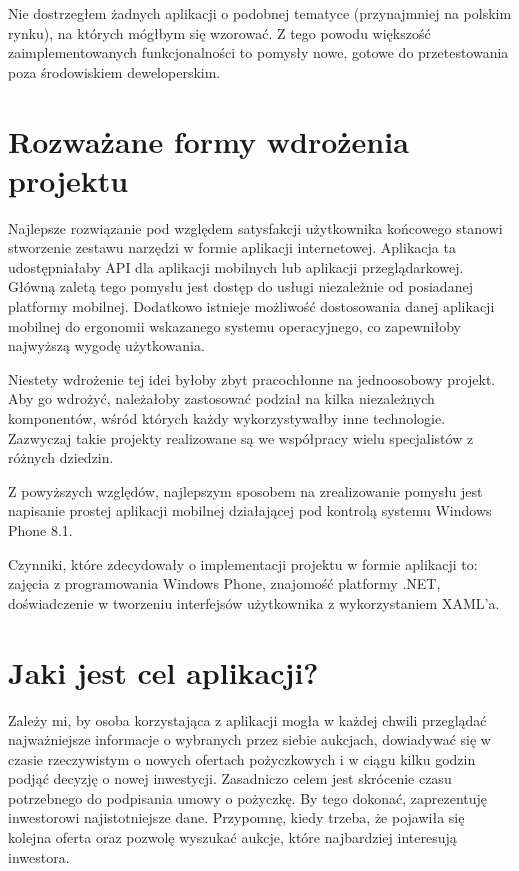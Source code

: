 \documentclass[a4paper,twoside,titlepage,openright]{book}
\begin{document}
Nie dostrzegłem żadnych aplikacji o podobnej tematyce (przynajmniej na polskim rynku), na których mógłbym się wzorować. Z tego powodu większość zaimplementowanych funkcjonalności to pomysły nowe, gotowe do przetestowania poza środowiskiem deweloperskim.

\section*{Rozważane formy wdrożenia projektu}

Najlepsze rozwiązanie pod względem satysfakcji użytkownika końcowego stanowi stworzenie zestawu narzędzi w formie aplikacji internetowej. Aplikacja ta udostępniałaby API dla aplikacji mobilnych lub aplikacji przeglądarkowej. Główną zaletą tego pomysłu jest dostęp do usługi niezależnie od posiadanej platformy mobilnej. Dodatkowo istnieje możliwość dostosowania danej aplikacji mobilnej do ergonomii wskazanego systemu operacyjnego, co zapewniłoby najwyższą wygodę użytkowania. 

Niestety wdrożenie tej idei byłoby zbyt pracochłonne na jednoosobowy projekt. Aby go wdrożyć, należałoby zastosować podział na kilka niezależnych komponentów, wśród których każdy wykorzystywałby inne technologie. Zazwyczaj takie projekty realizowane są we współpracy wielu specjalistów z różnych dziedzin.

Z powyższych względów, najlepszym sposobem na zrealizowanie pomysłu jest napisanie prostej aplikacji mobilnej działającej pod kontrolą systemu Windows Phone 8.1. 

Czynniki, które zdecydowały o implementacji projektu w formie aplikacji to: zajęcia z programowania Windows Phone, znajomość platformy .NET, doświadczenie w tworzeniu interfejsów użytkownika z wykorzystaniem XAML'a.

\section*{Jaki jest cel aplikacji?}

Zależy mi, by osoba korzystająca z aplikacji mogła w każdej chwili przeglądać najważniejsze informacje o wybranych przez siebie aukcjach, dowiadywać się w czasie rzeczywistym o nowych ofertach pożyczkowych i w ciągu kilku godzin podjąć decyzję o nowej inwestycji. Zasadniczo celem jest skrócenie czasu potrzebnego do podpisania umowy o pożyczkę. By tego dokonać, zaprezentuję inwestorowi najistotniejsze dane. Przypomnę, kiedy trzeba, że pojawiła się kolejna oferta oraz pozwolę wyszukać aukcje, które najbardziej interesują inwestora.
\end{document}
